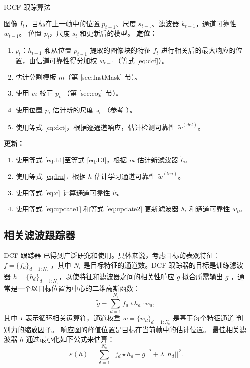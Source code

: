 \begin{algorithm}[t]
  \caption{IGCF 跟踪算法} 
  \begin{algorithmic}
    \Require 图像 $I_t$，目标在上一帧中的位置 $p_{t-1}$、尺度 $s_{t-1}$、滤波器 $h_{t-1}$，通道可靠性 $w_{t-1}$。
    \Ensure 位置 $p_t$，尺度 $s_t$ 和更新后的模型。
  \Statex
  \State \textbf{定位：}
  \begin{enumerate}[leftmargin=0pt,itemindent=1.5em]
    \item $p_t$：$h_{t-1}$ 和从位置 $p_{t-1}$ 提取的图像块的特征 $f_{t}$ 进行相关后的最大响应的位置，由信道可靠性得分加权 $w_{t-1}$（等式 \ref{eq:dcf}）。
    \item 估计分割模板 $m$（第 \ref{sec:InstMask} 节）。
    \item 使用 $m$ 校正 $p_t$ （第 \ref{sec:cog} 节）。
    \item 使用位置 $p_t$ 估计新的尺度 $s_ t$ （参考 \cite{Danelljan2014AccurateSE}）。
    \item 使用等式 \ref{eq:det}，根据逐通道响应，估计检测可靠性 $\tilde{w}^{(det)}$。
  \end{enumerate}
  \State \textbf{更新：}
  \begin{enumerate}[leftmargin=0pt,itemindent=1.5em]
    \item 使用等式 \ref{eq:h1}至等式 \ref{eq:h3}，根据 $m$ 估计新滤波器 $\tilde{h}$。
    \item 使用等式 \ref{eq:lrn}，根据 $h$ 估计学习通道可靠性 $\tilde{w}^{(lrn)}$。
    \item 使用等式 \ref{eq:c} 计算通道可靠性 $\tilde{w}$。
    \item 使用等式 \ref{eq:update1} 和等式 \ref{eq:update2} 更新滤波器 $h_t$ 和通道可靠性 $w_t$。
  \end{enumerate}
\end{algorithmic}
\end{algorithm}

\subsection{相关滤波跟踪器}
DCF 跟踪器 \cite{Danelljan2014AccurateSE, henriques2014high-speed, Li2014ASA} 已得到广泛研究和使用。具体来说，考虑目标的表观特征：$f=\{f_d\}_{d=1:N_c}$ ，其中 $N_c$ 是目标特征的通道数。DCF 跟踪器的目标是训练滤波器 $h=\{h_d\}_{d=1:N_c}$，以使特征和滤波器之间的相关性响应 $\tilde{g}$ 拟合所需输出 $g$ ，通常是一个以目标位置为中心的二维高斯函数： 
\begin{equation} \label{eq:dcf}
\tilde{g}=\sum_{d=1}^{N_c}f_d \star h_d \cdot w_d,
\end{equation}
其中 $\star$ 表示循环相关运算符，通道权重 $w = \{w_d\}_{d=1:N_c}$ 是基于每个特征通道 \cite{Lukezic2017DiscriminativeCF} 判别力的缩放因子。
响应图的峰值位置是目标在当前帧中的估计位置。
最佳相关滤波器 $h$ 通过最小化如下公式来估算：
\begin{equation}
\varepsilon(h) = \sum_{d=1}^{N_c}||f_d \star h_d - g||^2+\lambda||h_d||^2.
\end{equation}


